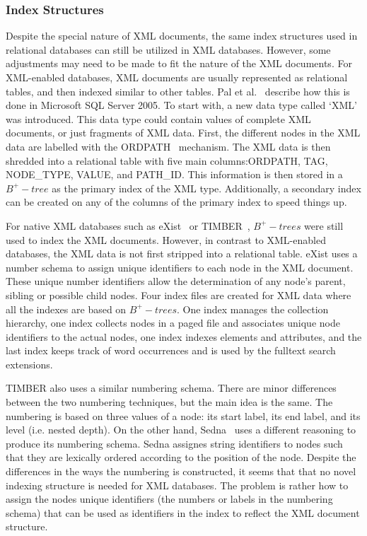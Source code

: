 \documentclass[12pt,a4paper]{article}
\begin{document}
\subsubsection{Index Structures}

Despite the special nature of XML documents, the same index structures used in relational databases can still be utilized in XML databases. However, some adjustments may need to be made to fit the nature of the XML documents. For XML-enabled databases, XML documents are usually represented as relational tables, and then indexed similar to other tables. Pal et al.~\cite{pal2004indexing} describe how this is done in Microsoft SQL Server 2005. To start with, a new data type called `XML' was introduced. This data type could contain values of complete XML documents, or just fragments of XML data. First, the different nodes in the XML data are labelled with the ORDPATH~\cite{o2004ordpaths} mechanism. The XML data is then shredded into a relational table with five main columns:ORDPATH, TAG, NODE\_TYPE, VALUE, and PATH\_ID. This information is then stored in a $B^{+}-tree$ as the primary index of the XML type. Additionally, a secondary index can be created on any of the columns of the primary index to speed things up.

For native XML databases such as eXist~\cite{meier2009exist} or TIMBER~\cite{jagadish2002timber}, $B^{+}-trees$ were still used to index the XML documents. However, in contrast to XML-enabled databases, the XML data is not first stripped into a relational table. eXist uses a number schema to assign unique identifiers to each node in the XML document. These unique number identifiers allow the determination of any node's parent, sibling or possible child nodes. Four index files are created for XML data where all the indexes are based on $B^{+}-trees$. One index manages the collection hierarchy, one index collects nodes in a paged file and associates unique node identifiers to the actual nodes, one index indexes elements and attributes, and the last index keeps track of word occurrences and is used by the fulltext search extensions.

TIMBER also uses a similar numbering schema. There are minor differences between the two numbering techniques, but the main idea is the same. The numbering is based on three values of a node: its start label, its end label, and its level (i.e. nested depth). On the other hand, Sedna~\cite{taranov2010sedna} uses a different reasoning to produce its numbering schema. Sedna assignes string identifiers to nodes such that they are lexically ordered according to the position of the node. Despite the differences in the ways the numbering is constructed, it seems that that no novel indexing structure is needed for XML databases. The problem is rather how to assign the nodes unique identifiers (the numbers or labels in the numbering schema) that can be used as identifiers in the index to reflect the XML document structure.
\end{document}
